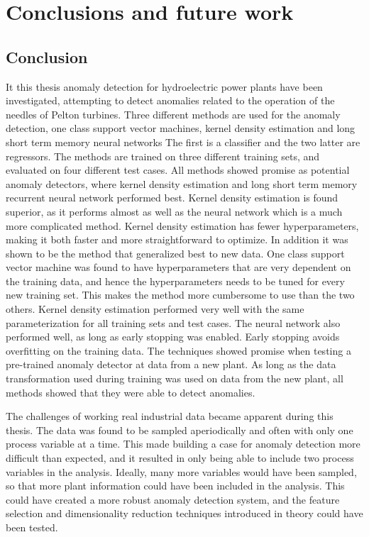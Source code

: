 \chapter{Conclusions and future work}\label{cha:conclusions}
%

\section{Conclusion}
    
    It this thesis anomaly detection for hydroelectric power plants have been investigated, attempting to detect anomalies related to the operation of the needles of Pelton turbines. Three different methods are used for the anomaly detection, one class support vector machines, kernel density estimation and long short term memory neural networks The first is a classifier and the two latter are regressors. The methods are trained on three different training sets, and evaluated on four different test cases. All methods showed promise as potential anomaly detectors, where kernel density estimation and long short term memory recurrent neural network performed best. Kernel density estimation is found superior, as it performs almost as well as the neural network which is a much more complicated method. Kernel density estimation has fewer hyperparameters, making it both faster and more straightforward to optimize. In addition it was shown to be the method that generalized best to new data. One class support vector machine was found to have hyperparameters that are very dependent on the training data, and hence the hyperparameters needs to be tuned for every new training set. This makes the method more cumbersome to use than the two others. Kernel density estimation performed very well with the same parameterization for all training sets and test cases. The neural network also performed well, as long as early stopping was enabled. Early stopping avoids overfitting on the training data. The techniques showed promise when testing a pre-trained anomaly detector at data from a new plant. As long as the data transformation used during training was used on data from the new plant, all methods showed that they were able to detect anomalies.           
    
    The challenges of working real industrial data became apparent during this thesis. The data was found to be sampled aperiodically and often with only one process variable at a time. This made building a case for anomaly detection more difficult than expected, and it resulted in only being able to include two process variables in the analysis. Ideally, many more variables would have been sampled, so that more plant information could have been included in the analysis. This could have created a more robust anomaly detection system, and the feature selection and dimensionality reduction techniques introduced in theory could have been tested. 
    
